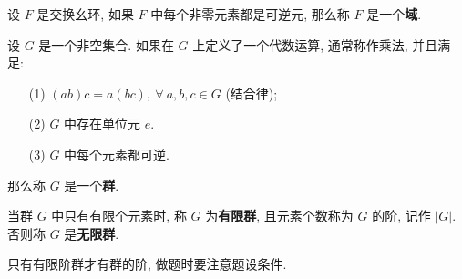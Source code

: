 \begin{definition}\label{域}
	设 $F$ 是交换幺环, 如果 $F$ 中每个非零元素都是可逆元, 那么称 $F$ 是一个\textbf{域}.
\end{definition}

\begin{definition}\label{群}
	设 $G$ 是一个非空集合. 如果在 $G$ 上定义了一个代数运算, 通常称作乘法, 并且满足:
	\begin{itemize}[leftmargin=1.5cm]
		\item[(1)] $(ab)c=a(bc),\ \forall\ a,b,c\in G$ (结合律);
		\item[(2)] $G$ 中存在单位元 $e$.
		\item[(3)] $G$ 中每个元素都可逆.
	\end{itemize}
	那么称 $G$ 是一个\textbf{群}.
\end{definition}

\begin{definition}
	当群 $G$ 中只有有限个元素时, 称 $G$ 为\textbf{有限群}, 且元素个数称为 $G$ 的阶, 记作 $|G|$. 否则称 $G$ 是\textbf{无限群}.
\end{definition}

\begin{remark*}
	只有有限阶群才有群的阶, 做题时要注意题设条件.
\end{remark*}